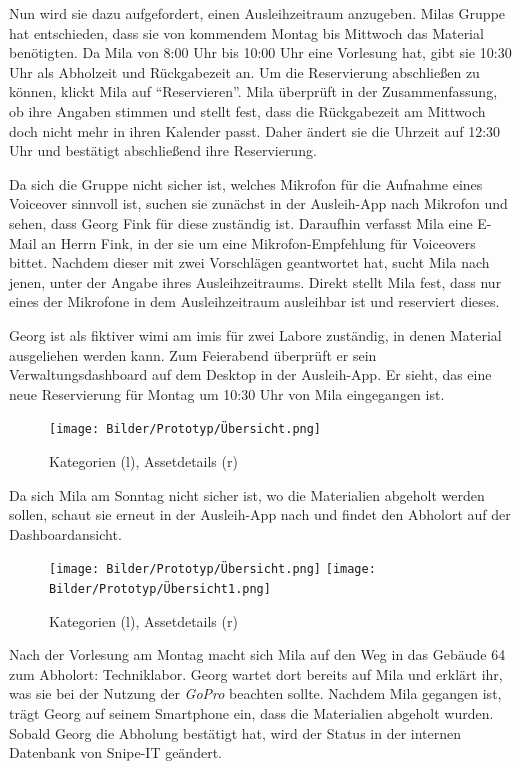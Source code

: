 Nun wird sie dazu aufgefordert, einen Ausleihzeitraum anzugeben. Milas Gruppe
hat entschieden, dass sie von kommendem Montag bis Mittwoch das Material
benötigten. Da Mila von 8:00 Uhr bis 10:00 Uhr eine Vorlesung hat, gibt sie
10:30 Uhr als Abholzeit und Rückgabezeit an. Um die Reservierung abschließen zu
können, klickt Mila auf \enquote{Reservieren}. Mila überprüft in der
Zusammenfassung, ob ihre Angaben stimmen und stellt fest, dass die Rückgabezeit
am Mittwoch doch nicht mehr in ihren Kalender passt. Daher ändert sie die
Uhrzeit auf 12:30 Uhr und bestätigt abschließend ihre Reservierung.

Da sich die Gruppe nicht sicher ist, welches Mikrofon für die Aufnahme eines
Voiceover sinnvoll ist, suchen sie zunächst in der Ausleih-App nach Mikrofon und
sehen, dass Georg Fink für diese zuständig ist. Daraufhin verfasst Mila eine
E-Mail an Herrn Fink, in der sie um eine Mikrofon-Empfehlung für Voiceovers
bittet. Nachdem dieser mit zwei Vorschlägen geantwortet hat, sucht Mila nach
jenen, unter der Angabe ihres Ausleihzeitraums.  Direkt stellt Mila fest, dass
nur eines der Mikrofone in dem Ausleihzeitraum ausleihbar ist und reserviert
dieses.

Georg ist als fiktiver \ac{wimi} am \ac{imis} für zwei Labore zuständig, in
denen Material ausgeliehen werden kann. Zum Feierabend überprüft er sein
Verwaltungsdashboard auf dem Desktop in der Ausleih-App. Er sieht, das eine neue
Reservierung für Montag um 10:30 Uhr von Mila eingegangen ist.

\begin{figure}[h]
    \centering
    \texttt{[image: Bilder/Prototyp/Übersicht.png]}
    \label{fig:p4}
    \caption[Mockup: Kategorien, Assets, Assetdetails]{Kategorien (l), Assetdetails (r)}
\end{figure}

Da sich Mila am Sonntag nicht sicher ist, wo die Materialien abgeholt werden
sollen, schaut sie erneut in der Ausleih-App nach und findet den Abholort auf
der Dashboardansicht.

\begin{figure}[h]
    \centering
    \texttt{[image: Bilder/Prototyp/Übersicht.png]}\hspace{2em}
    \texttt{[image: Bilder/Prototyp/Übersicht1.png]}
    \label{fig:p4}
    \caption[Mockup: Kategorien, Assets, Assetdetails]{Kategorien (l), Assetdetails (r)}
\end{figure}

Nach der Vorlesung am Montag macht sich Mila auf den Weg in das Gebäude 64 zum
Abholort: Techniklabor. Georg wartet dort bereits auf Mila und erklärt ihr, was
sie bei der Nutzung der \textit{GoPro} beachten sollte. Nachdem Mila gegangen ist, trägt
Georg auf seinem Smartphone ein, dass die Materialien abgeholt wurden. Sobald
Georg die Abholung bestätigt hat, wird der Status in der internen Datenbank von
Snipe-IT geändert.

